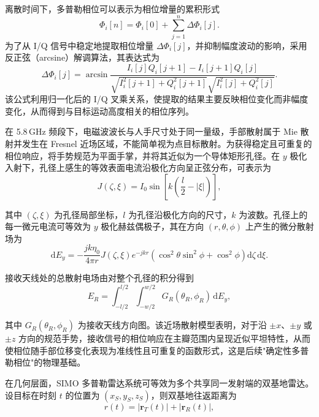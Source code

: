 离散时间下，多普勒相位可以表示为相位增量的累积形式
\begin{equation}
\Phi_i[n] = \Phi_i[0] + \sum_{j=1}^{n}\Delta\Phi_i[j].
\end{equation}
为了从 I/Q 信号中稳定地提取相位增量 $\Delta\Phi_i[j]$，并抑制幅度波动的影响，采用反正弦（arcsine）解调算法，其表达式为
\begin{equation}
\Delta \Phi_i[j]
=
\arcsin
\frac{I_i[j]Q_i[j+1]-I_i[j+1]Q_i[j]}
{\sqrt{I_i^2[j+1]+Q_i^2[j+1]}\sqrt{I_i^2[j]+Q_i^2[j]}}.
\end{equation}
该公式利用归一化后的 I/Q 叉乘关系，使提取的结果主要反映相位变化而非幅度变化，从而得到与目标运动高度相关的相位序列。

在 5.8\,GHz 频段下，电磁波波长与人手尺寸处于同一量级，手部散射属于 Mie 散射并发生在 Fresnel 近场区域，不能简单视为点目标散射。为获得稳定且可重复的相位响应，将手势规范为平面手掌，并将其近似为一个导体矩形孔径。在 $y$ 极化入射下，孔径上感生的等效表面电流沿极化方向呈正弦分布，可表示为
\begin{equation}
J(\zeta,\xi)= I_0\sin\!\left[k\left(\frac{l}{2}-|\xi|\right)\right],
\end{equation}

其中 $(\zeta,\xi)$ 为孔径局部坐标，$l$ 为孔径沿极化方向的尺寸，$k$ 为波数。孔径上的每一微元电流可等效为 $y$ 极化赫兹偶极子，其在方向 $(r,\theta,\phi)$ 上产生的微分散射场为
\begin{equation}
\mathrm{d}E_y
=
-\frac{jk\eta_0}{4\pi r}
J(\zeta,\xi)e^{-jkr}
\left(\cos^2\theta\sin^2\phi+\cos^2\phi\right)
\mathrm{d}\zeta\,\mathrm{d}\xi.
\end{equation}

接收天线处的总散射电场由对整个孔径的积分得到
\begin{equation}
E_R
=
\int_{-l/2}^{l/2}\int_{-w/2}^{w/2}
G_R(\theta_R,\phi_R)\,\mathrm{d}E_y,
\end{equation}

其中 $G_R(\theta_R,\phi_R)$ 为接收天线方向图。该近场散射模型表明，对于沿 $\pm x$、$\pm y$ 或 $\pm z$ 方向的规范手势，接收信号的相位响应在主瓣范围内呈现近似平坦特性，从而使相位随手部位移变化表现为准线性且可重复的函数形式，这是后续"确定性多普勒相位"的物理基础。

在几何层面，SIMO 多普勒雷达系统可等效为多个共享同一发射端的双基地雷达。设目标在时刻 $t$ 的位置为 $(x_S,y_S,z_S)$，则双基地往返距离为
\begin{equation}
r(t)=|\mathbf{r}_T(t)|+|\mathbf{r}_R(t)|,
\end{equation}

